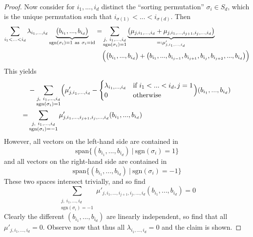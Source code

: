 \documentclass{scrartcl}
\newcommand{\sgn}{\mathrm{sgn}}
\newcommand{\vspan}{\mathrm{span}}
\theoremstyle{definition}
\begin{document}
\begin{proof}
    Now consider for $i_1, ..., i_d$ distinct the ``sorting permutation'' $\sigma_i \in S_d$, which is the unique permutation such that $i_{\sigma(1)} < ... < i_{\sigma(d)}$.
    Then
    \begin{align*}
        \sum_{i_1 < ... < i_d} \lambda_{i_1, ..., i_d} \underbrace{\bigl( b_{i_1}, ..., b_{i_d} \bigr)}_{\sgn(\sigma_i) = 1 \ \text{as} \ \sigma_i = \mathrm{id}} = &\sum_{\substack{j, \ i_1, ..., i_d\\\sgn(\sigma_i) = 1}} \underbrace{\bigl( \mu_{j, i_1, ..., i_d} + \mu_{j, i_1, ..., i_{j + 1}, i_j, ..., i_d} \bigr)}_{=: \mu'_{j, i_1, ..., i_d}} \\
        &\Bigl( \bigl( b_{i_1}, ..., b_{i_d} \bigr) + \bigl( b_{i_1}, ..., b_{i_{j - 1}}, b_{i_{j + 1}}, b_{i_j}, b_{i_{j + 2}}, ..., b_{i_d} \bigr) \Bigr)
    \end{align*}
    This yields
    \begin{align*}
        &-\sum_{\substack{j, \ i_1, ..., i_d\\\sgn(\sigma_i) = 1}} \Bigl( \mu'_{j, i_1, ..., i_d} - \begin{cases}
            \lambda_{i_1, ..., i_d} & \text{if $i_1 < ... < i_d, j = 1$} \\
            0 & \text{otherwise}
        \end{cases} \Bigr) (b_{i_1}, ..., b_{i_d}) \\
        =& \sum_{\substack{j, \ i_1, ..., i_d\\\sgn(\sigma_i) = -1}} \mu'_{j, i_1, ..., i_{j + 1}, i_j, ..., i_d} (b_{i_1}, ..., b_{i_d})
    \end{align*}
    However, all vectors on the left-hand side are contained in
    \begin{equation*}
        \vspan \{(b_{i_1}, ..., b_{i_d}) \ | \ \sgn(\sigma_i) = 1 \}
    \end{equation*}
    and all vectors on the right-hand side are contained in
    \begin{equation*}
        \vspan \{(b_{i_1}, ..., b_{i_d}) \ | \ \sgn(\sigma_i) = -1 \}
    \end{equation*}
    These two spaces intersect trivially, and so find
    \begin{equation*}
        \sum_{\substack{j, \ i_1, ..., i_d\\\sgn(\sigma_i) = -1}} \mu'_{j, i_1, ..., i_{j + 1}, i_j, ..., i_d} (b_{i_1}, ..., b_{i_d}) = 0
    \end{equation*}
    Clearly the different $(b_{i_1}, ..., b_{i_d})$ are linearly independent, so find that all $\mu'_{j, i_1, ..., i_d} = 0$.
    Observe now that thus all $\lambda_{i_1, ..., i_d} = 0$ and the claim is shown.
\end{proof}
\end{document}

